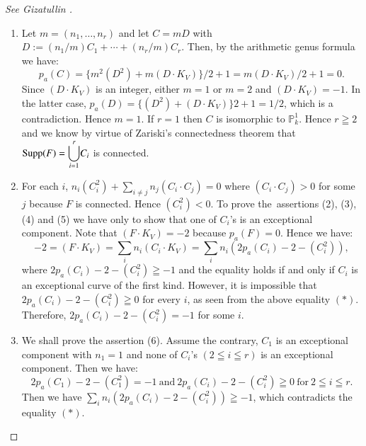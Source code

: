 \begin{proof}[See Gizatullin \cite{16}]
\begin{enumerate}
\renewcommand{\theenumi}{\Roman{enumi}}
\renewcommand{\labelenumi}{(\theenumi)}
\item Let $m=(n_{1},\ldots,n_{r})$ and let $C=mD$ with
  $D:=(n_{1}/m)C_{1}+\cdots +(n_{r}/m)C_{r}$. Then, by the arithmetic
  genus formula we have:
$$
p_{a}(C)=\{m^{2}(D^{2})+m(D\cdot K_{V})\}/2+1=m(D\cdot K_{V})/2+1=0.
$$
Since $(D\cdot K_{V})$ is an integer, either $m=1$ or $m=2$ and
$(D\cdot K_{V})=-1$. In the latter case, $p_{a}(D)=\{(D^{2})+(D\cdot
K_{V})\}2+1=1/2$, which is a contradiction. Hence $m=1$. If $r=1$ then
$C$ is isomorphic to $\mathbb{P}^{1}_{k}$. Hence $r\geqq 2$ and we
know by virtue of Zariski's connectedness theorem that
$\operatorname{Supp}(F)={\displaystyle{\mathop{\bigcup}^{r}_{i=1}}}C_{i}$ is
connected.

\item For each $i$,
  $n_{i}(C^{2}_{i})+{\displaystyle{\mathop{\sum}_{i\neq
      j}}}n_{j}(C_{i}\cdot C_{j})=0$ where $(C_{i}\cdot C_{j})>0$ for
  some $j$ because $F$ is connected. Hence $(C^{2}_{i})<0$. To prove
  the\pageoriginale\ assertions (2), (3), (4) and (5) we have only to
  show that one of $C_{i}$'s is an exceptional component. Note that
  $(F\cdot K_{V})=-2$ because $p_{a}(F)=0$. Hence we have:
\begin{equation*}
-2=(F\cdot K_{V})=\sum_{i}n_{i}(C_{i}\cdot
K_{V})=\sum_{i}n_{i}(2p_{a}(C_{i})-2-(C^{2}_{i})),\tag{$\ast$}
\end{equation*}
where $2p_{a}(C_{i})-2-(C^{2}_{i})\geqq -1$ and the equality holds if
and only if $C_{i}$ is an exceptional curve of the first
kind. However, it is impossible that $2p_{a}(C_{i})-2-(C^{2}_{i})\geqq
0$ for every $i$, as seen from the above equality $(\ast)$. Therefore,
$2p_{a}(C_{i})-2-(C^{2}_{i})=-1$ for some $i$. 

\item We shall prove the assertion (6). Assume the contrary, \iec
  $C_{1}$ is an exceptional component with $n_{1}=1$ and none of
  $C_{i}$'s $(2\leqq i\leqq r)$ is an exceptional component. Then we
  have:
$$
2p_{a}(C_{1})-2-(C^{2}_{1})=-1~\text{and}~
2p_{a}(C_{i})-2-(C^{2}_{i})\geqq 0~\text{for}~ 2\leqq i\leqq r.
$$
Then we have
${\displaystyle{\mathop{\sum}_{i}}}n_{i}(2p_{a}(C_{i})-2-(C^{2}_{i}))\geqq
-1$, which contradicts the equality $(\ast)$.
\end{enumerate}
\end{proof}

